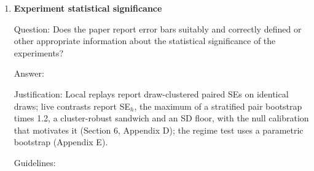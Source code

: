\documentclass[
]{article}
\begin{document}
\begin{enumerate}
  Guidelines:

  \begin{itemize}
  \item
    The answer \answerNA{} means that the paper does not include
    experiments.
  \item
    The experimental setting should be presented in the core of the
    paper to a level of detail that is necessary to appreciate the
    results and make sense of them.
  \item
    The full details can be provided either with the code, in appendix,
    or as supplemental material.
  \end{itemize}
\item
  \textbf{Experiment statistical significance}

  Question: Does the paper report error bars suitably and correctly
  defined or other appropriate information about the statistical
  significance of the experiments?

  Answer: \answerYes{}

  Justification: Local replays report draw-clustered paired SEs on
  identical draws; live contrasts report SE\(_h\), the maximum of a
  stratified pair bootstrap times 1.2, a cluster-robust sandwich and an
  SD floor, with the null calibration that motivates it (Section 6,
  Appendix D); the regime test uses a parametric bootstrap (Appendix E).

  Guidelines:


\end{enumerate}
\end{document}

